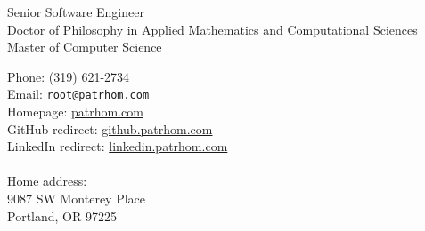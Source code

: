 \begin{minipage}[t]{0.5\textwidth}
  {\large Senior Software Engineer} \vspace{0.5em} \\
  \phantom{1} Doctor of Philosophy in Applied Mathematics and Computational Sciences  \vspace{0.5em} \\
  \phantom{1} Master of Computer Science\\
\end{minipage}
\hfill
\begin{minipage}[t]{0.4\textwidth}
  Phone: (319) 621-2734 \\
  Email: \href{mailto:root@patrhom.com}{\texttt{root@patrhom.com}} \\
  Homepage: \url{patrhom.com} \\
  GitHub redirect: \url{github.patrhom.com} \\
  LinkedIn redirect: \url{linkedin.patrhom.com} \\
  \\
  Home address: \\
  9087 SW Monterey Place \\
  Portland, OR 97225
  
\end{minipage}
